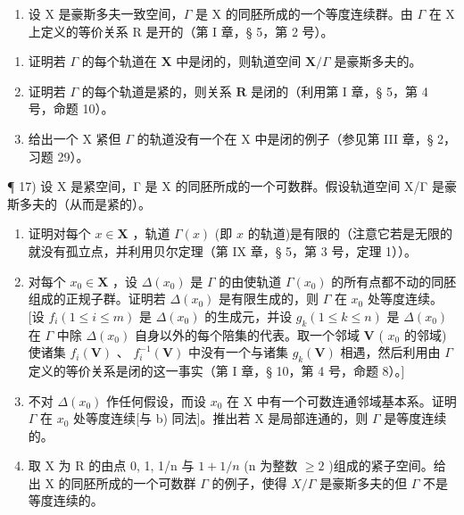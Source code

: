 \begin{enumerate}
\def\labelenumi{\arabic{enumi})}
\setcounter{enumi}{15}
\tightlist
\item
  设 X 是豪斯多夫一致空间，\(\Gamma\) 是 X 的同胚所成的一个等度连续群。由 \(\Gamma\) 在 X 上定义的等价关系 R 是开的（第 I 章，§ 5，第 2 号）。
\end{enumerate}

\begin{enumerate}
\def\labelenumi{\alph{enumi})}
\item
  证明若 \(\Gamma\) 的每个轨道在 \(\mathbf{X}\) 中是闭的，则轨道空间 \(\mathbf{X} / \Gamma\) 是豪斯多夫的。
\item
  证明若 \(\Gamma\) 的每个轨道是紧的，则关系 \(\mathbf{R}\) 是闭的（利用第 I 章，§ 5，第 4 号，命题 10）。
\item
  给出一个 X 紧但 \(\Gamma\) 的轨道没有一个在 X 中是闭的例子（参见第 III 章，§ 2，习题 29）。
\end{enumerate}

¶ 17) 设 X 是紧空间，Γ 是 X 的同胚所成的一个可数群。假设轨道空间 X/Γ 是豪斯多夫的（从而是紧的）。

\begin{enumerate}
\def\labelenumi{\alph{enumi})}
\item
  证明对每个 \(x \in \mathbf{X}\) ，轨道 \(\Gamma(x)\) (即 \(x\) 的轨道)是有限的（注意它若是无限的就没有孤立点，并利用贝尔定理（第 IX 章，§ 5，第 3 号，定理 1））。
\item
  对每个 \(x_0 \in \mathbf{X}\) ，设 \(\Delta(x_0)\) 是 \(\Gamma\) 的由使轨道 \(\Gamma(x_0)\) 的所有点都不动的同胚组成的正规子群。证明若 \(\Delta(x_0)\) 是有限生成的，则 \(\Gamma\) 在 \(x_0\) 处等度连续。{[}设 \(f_i (1 \leqslant i \leqslant m)\) 是 \(\Delta(x_0)\) 的生成元，并设 \(g_k (1 \leqslant k \leqslant n)\) 是 \(\Delta(x_0)\) 在 \(\Gamma\) 中除 \(\Delta(x_0)\) 自身以外的每个陪集的代表。取一个邻域 \(\mathbf{V}\) ( \(x_0\) 的邻域)使诸集 \(f_i(\mathbf{V})\) 、 \(f_i^{-1}(\mathbf{V})\) 中没有一个与诸集 \(g_k(\mathbf{V})\) 相遇，然后利用由 \(\Gamma\) 定义的等价关系是闭的这一事实（第 I 章，§ 10，第 4 号，命题 8）。{]}
\item
  不对 \(\Delta(x_{0})\) 作任何假设，而设 \(x_{0}\) 在 X 中有一个可数连通邻域基本系。证明 \(\Gamma\) 在 \(x_{0}\) 处等度连续{[}与 b) 同法{]}。推出若 X 是局部连通的，则 \(\Gamma\) 是等度连续的。
\item
  取 X 为 R 的由点 0, 1, 1/n 与 \(1 + 1/n\) (n 为整数 \(\geqslant 2\) )组成的紧子空间。给出 X 的同胚所成的一个可数群 \(\Gamma\) 的例子，使得 \(X/\Gamma\) 是豪斯多夫的但 \(\Gamma\) 不是等度连续的。
\end{enumerate}

